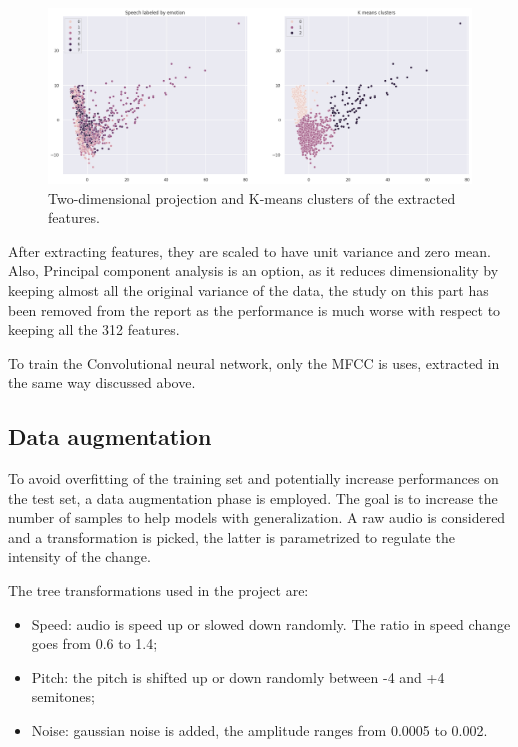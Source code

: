 \begin{figure}
  \begin{center}
    \includegraphics[width=\textwidth]{images/2d.png}
    \caption{Two-dimensional projection and K-means clusters of the extracted features.} \label{fig:2d}
  \end{center}
\end{figure}

\noindent After extracting features, they are scaled to have unit variance and 
zero mean. 
Also, Principal component analysis is an option, as it reduces dimensionality by 
keeping almost all the original variance of the data, the study on this 
part has been removed from the report as the performance is much worse with respect 
to keeping all the 312 features.

To train the Convolutional neural network, only the MFCC is uses, extracted in the same way 
discussed above.

\subsection{Data augmentation}

To avoid overfitting of the training set and potentially increase 
performances on the test set, a data augmentation phase is employed.
The goal is to increase the number of samples to help models with generalization. 
A raw audio is considered and a transformation is picked, the latter is parametrized to 
regulate the intensity of the change. 

\noindent The tree transformations used in the project are: 
\begin{itemize}
  \item Speed: audio is speed up or slowed down randomly. The ratio 
  in speed change goes from 0.6 to 1.4;
  \item Pitch: the pitch is shifted up or down randomly between -4 and +4 semitones;
  \item Noise: gaussian noise is added, the amplitude ranges from 0.0005 to 0.002.
\end{itemize}

